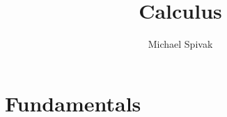 \documentclass[krantz1]{krantz}
\begin{document}
\frontmatter

\title{Calculus}
\author{Michael Spivak}

\maketitle

%
\setcounter{page}{7} %
\tableofcontents
%
%
%
%

\mainmatter

\part{Fundamentals}

%







\printindex
\end{document}

